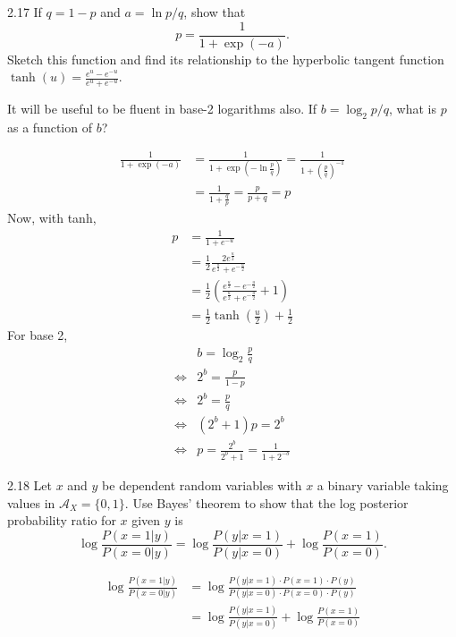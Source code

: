 \documentclass[12pt, a4paper]{article}
\begin{document}
\begin{prob}{2.17}
    If $q = 1 - p$ and $a = \ln p/q$, show that
\begin{equation}
    p = \frac{1}{1 + \exp(-a)}. \tag{2.50}
\end{equation}
Sketch this function and find its relationship to the hyperbolic tangent function $\tanh(u) = \frac{e^u - e^{-u}}{e^u + e^{-u}}$.

\medskip

\noindent It will be useful to be fluent in base-2 logarithms also. If $b = \log_2 p/q$, what is $p$ as a function of $b$?
\end{prob}
\begin{sol}
    \begin{align*}
        \frac{1}{1+\exp(-a)} &= \frac{1}{1 + \exp(-\ln \frac{p}{q})} = \frac{1}{1 + (\frac{p}{q})^{-1}} \\
        &= \frac{1}{1 + \frac{q}{p}} = \frac{p}{p + q} = p 
    \end{align*}
    Now, with tanh, 
    \begin{align*}
        p &= \frac{1}{1 + e^{-u}} \\
        &= \frac{1}{2} \frac{2e^{\frac{u}{2}}}{e^{\frac{u}{2}} + e^{-\frac{u}{2}}} \\
        &= \frac{1}{2} \left( \frac{e^{\frac{u}{2}} - e^{-\frac{u}{2}}}{e^{\frac{u}{2}} + e^{-\frac{u}{2}}} + 1 \right) \\
        &= \frac{1}{2} \tanh \left(\frac{u}{2}\right) + \frac{1}{2}
    \end{align*}
    For base 2,
    \begin{align*}
          & b = \log_2 \frac{p}{q} \\
        \iff & 2^b = \frac{p}{1-p} \\
        \iff & 2^b = \frac{p}{q} \\
        \iff & (2^b + 1)p = 2^b \\
        \iff & p = \frac{2^b}{2^b + 1} = \frac{1}{1 + 2^{-b}}
    \end{align*}
\end{sol}
\bigskip

\begin{prob}{2.18}
Let $x$ and $y$ be dependent random variables with $x$ a binary variable taking values in $\mathcal{A}_X = \{0, 1\}$. Use Bayes' theorem to show that the log posterior probability ratio for $x$ given $y$ is
\begin{equation}
\log \frac{P(x=1 | y)}{P(x=0 | y)} = \log \frac{P(y | x=1)}{P(y | x=0)} + \log \frac{P(x=1)}{P(x=0)}. \tag{2.51}
\end{equation}
\end{prob}
\begin{sol}
\begin{align*}
    \log \frac{P(x=1 | y)}{P(x=0 | y)} &= \log \frac{P(y | x=1) \cdot P(x=1) \cdot P(y)}{P(y | x=0)\cdot P(x=0)\cdot P(y)} \\
    &= \log \frac{P(y | x=1)}{P(y | x=0)} + \log \frac{P(x=1)}{P(x=0)}
\end{align*}
\end{sol}
\bigskip
\end{document}
